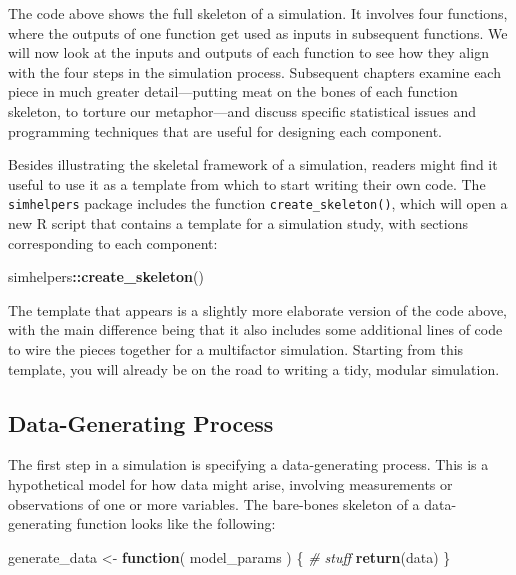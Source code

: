 \documentclass[
]{book}
\newenvironment{Shaded}{\begin{snugshade}}{\end{snugshade}}
\newcommand{\CommentTok}[1]{\textcolor[rgb]{0.56,0.35,0.01}{\textit{#1}}}
\newcommand{\ControlFlowTok}[1]{\textcolor[rgb]{0.13,0.29,0.53}{\textbf{#1}}}
\newcommand{\FunctionTok}[1]{\textcolor[rgb]{0.13,0.29,0.53}{\textbf{#1}}}
\newcommand{\NormalTok}[1]{#1}
\newcommand{\OtherTok}[1]{\textcolor[rgb]{0.56,0.35,0.01}{#1}}
\newcommand{\SpecialCharTok}[1]{\textcolor[rgb]{0.81,0.36,0.00}{\textbf{#1}}}
\begin{document}
The code above shows the full skeleton of a simulation.
It involves four functions, where the outputs of one function get used as inputs in subsequent functions.
We will now look at the inputs and outputs of each function to see how they align with the four steps in the simulation process.
Subsequent chapters examine each piece in much greater detail---putting meat on the bones of each function skeleton, to torture our metaphor---and discuss specific statistical issues and programming techniques that are useful for designing each component.

Besides illustrating the skeletal framework of a simulation, readers might find it useful to use it as a template from which to start writing their own code.
The \texttt{simhelpers} package includes the function \texttt{create\_skeleton()}, which will open a new R script that contains a template for a simulation study, with sections corresponding to each component:

\begin{Shaded}
\begin{Highlighting}[]
\NormalTok{simhelpers}\SpecialCharTok{::}\FunctionTok{create\_skeleton}\NormalTok{()}
\end{Highlighting}
\end{Shaded}

The template that appears is a slightly more elaborate version of the code above, with the main difference being that it also includes some additional lines of code to wire the pieces together for a multifactor simulation.
Starting from this template, you will already be on the road to writing a tidy, modular simulation.

\subsection{Data-Generating Process}\label{data-generating-process}

The first step in a simulation is specifying a data-generating process. This is a hypothetical model for how data might arise, involving measurements or observations of one or more variables. The bare-bones skeleton of a data-generating function looks like the following:

\begin{Shaded}
\begin{Highlighting}[]
\NormalTok{generate\_data }\OtherTok{\textless{}{-}} \ControlFlowTok{function}\NormalTok{( model\_params ) \{}
  \CommentTok{\# stuff}
  \FunctionTok{return}\NormalTok{(data)}
\NormalTok{\}}
\end{Highlighting}
\end{Shaded}
\end{document}
